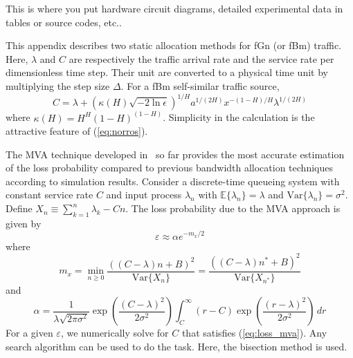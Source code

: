 \documentclass[12pt,oneside,openright,a4paper]{cpe-thai-project}
\begin{document}
This is where you put hardware circuit diagrams, detailed experimental data in tables or source codes, etc.. \\ \bigskip



This appendix describes two static allocation methods for fGn (or fBm)
traffic. Here, $\lambda$ and $C$ are respectively the traffic arrival
rate and the service rate per dimensionless time step. Their unit are
converted to a physical time unit by multiplying the step size
$\Delta$. For a fBm self-similar traffic source,
\begin{equation}\label{eq:norros}
  C = \lambda + (\kappa(H)\sqrt{-2\ln\epsilon})^{1/H}a^{1/(2H)}x^{-(1-H)/H}\lambda^{1/(2H)}
\end{equation}
where $\kappa(H) = H^H(1-H)^{(1-H)}$. Simplicity in the calculation is
the attractive feature of (\ref{eq:norros}).

The MVA technique developed in~\cite{kim01} so far provides the most
accurate estimation of the loss probability compared to previous
bandwidth allocation techniques according to simulation results.
Consider a discrete-time queueing system with constant service rate
$C$ and input process $\lambda_n$ with $\mathbb{E}\{\lambda_n\} =
\lambda$ and $\mathrm{Var}\{\lambda_n\} = \sigma^2$.  Define $X_n \equiv
\sum_{k=1}^n \lambda_k - Cn$.  The loss probability due to the MVA
approach is given by
\begin{equation}\label{eq:loss_mva}
  \varepsilon \approx \alpha e^{-m_x/2}
\end{equation}
where
\begin{equation}\label{eq:mx}
m_x = \min_{n \geq 0} \frac{((C-\lambda)n + B)^2}{\mathrm{Var}\{X_n\}} =
\frac{((C-\lambda)n^\ast + B)^2}{\mathrm{Var}\{X_{n^{\ast}}\}}
\end{equation} 
and 
\begin{equation}\label{eq:alpha}
  \alpha =
  \frac{1}{\lambda\sqrt{2\pi\sigma^2}}\exp\left(\frac{(C-\lambda)^2}{2\sigma^2}\right)
  \int_C^\infty (r-C)\exp\left(\frac{(r-\lambda)^2}{2\sigma^2}\right)\, dr
\end{equation}
For a given $\varepsilon$, we numerically solve for $C$ that satisfies
(\ref{eq:loss_mva}). Any search algorithm can be used to do the task.
Here, the bisection method is used.  
\end{document}
